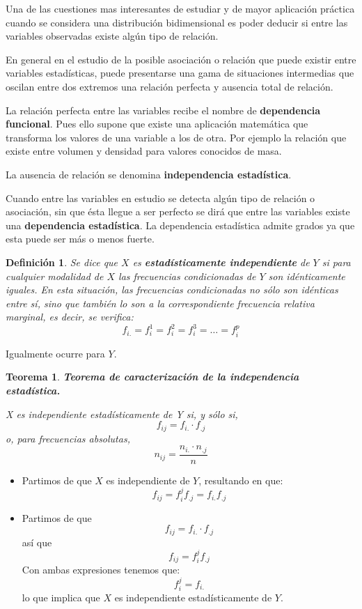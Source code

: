 \documentclass[10pt, a4paper]{article}
\makeatletter
\renewenvironment{proof}[1][\proofname] {\par\pushQED{\qed}\normalfont\topsep6\p@\@plus6\p@\relax\trivlist\item[\hskip\labelsep\itshape\sffamily#1\@addpunct{.}]\ignorespaces}{\popQED\endtrivlist\@endpefalse}
\theoremstyle{theorem-style}
\newtheorem{nth}{Teorema}[section]
\theoremstyle{definition-style}
\newtheorem{ndef}{Definición}[section]
\theoremstyle{remark-style}
\theoremstyle{example-style}
\theoremstyle{definition-style}
\theoremstyle{remark-style}
\makeatother
\begin{document}
 Una de las cuestiones mas interesantes de estudiar y de mayor aplicación
 práctica cuando se considera una distribución bidimensional es poder deducir si
 entre las variables observadas existe algún tipo de relación.

 En general en el estudio de la posible asociación o relación que puede existir
 entre variables estadísticas, puede presentarse una gama de situaciones
 intermedias que oscilan entre dos extremos una relación perfecta y ausencia
 total de relación.

 La relación perfecta entre las variables recibe el nombre de
 \textbf{dependencia funcional}. Pues ello supone que existe una aplicación
 matemática que transforma los valores de una variable a los de otra. Por
 ejemplo la relación que existe entre volumen y densidad para valores conocidos
 de masa.

 La ausencia de relación se denomina \textbf{independencia estadística}.

 Cuando entre las variables en estudio se detecta algún tipo de relación o
 asociación, sin que ésta llegue a ser perfecto se dirá que entre las variables
 existe una \textbf{dependencia estadística}. La dependencia estadística admite
 grados ya que esta puede ser más o menos fuerte.\\


\begin{ndef}
	Se dice que $X$ es \textbf{estadísticamente independiente} de $Y$ si para cualquier
 modalidad de $X$ las frecuencias condicionadas de $Y$ son idénticamente iguales. En
 esta situación, las frecuencias condicionadas no sólo son idénticas entre sí,
 sino que también lo son a la correspondiente frecuencia relativa marginal, es decir, se verifica:
 $$ f_{i.} = f_i^{1} = f_i^{2} = f_i^{3} = \ldots = f_i^p $$
\end{ndef}
 

 Igualmente ocurre para $Y$.

 \vspace{0.5cm}

\begin{nth}
\textbf{Teorema de caracterización de la independencia estadística.}

X es independiente estadísticamente de Y si, y sólo si, $$ f_{ij} = f_{i.} \cdot
f_{.j} $$ o, para frecuencias absolutas, $$n_{ij} = \frac{n_{i.}\cdot n_{.j}}{n}$$
\end{nth}

\begin{proof}\hspace{1cm}
\begin{itemize}
	\item[\boxed{\Rightarrow}] Partimos de que $X$ es independiente de $Y$, resultando en que:  $$f_{ij} = f_i^j f_{.j} = f_{i.} f_{.j}$$
	\pagebreak
	\item[\boxed{\Leftarrow}] Partimos de que $$ f_{ij} = f_{i.} \cdot f_{.j} $$ así que $$ f_{ij} =
f_i^j f_{.j} $$ Con ambas expresiones tenemos que: $$f_i^j = f_{i.} $$ lo que implica que $X$ es independiente estadísticamente de $Y$.
\end{itemize}
\end{proof}
\end{document}

